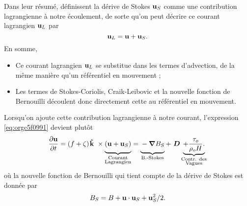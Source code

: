 \documentclass[10pt]{report}
\numberwithin{equation}{section}
\newcommand{\kvf}{\vb{\hat{k}}}
\newcommand{\uu}{\vb{u}}
\newcommand{\grande}{\vphantom{\frac{1}{xx}}}
\newcommand{\pt}{\hspace{1pt}} %
\begin{document}
Dans leur résumé, \Textcite{suzuki2016understanding}  définissent la dérive de Stokes \(\uu_S\) comme une contribution lagrangienne à notre écoulement, de sorte qu'on peut décrire ce courant lagrangien \(\uu_L\) par
\begin{equation}
   \uu_L = \uu + \uu_S.
\end{equation}
En somme, 
\begin{itemize}
\item Ce courant lagrangien \(\uu_L\) se substitue dans les termes d'advection, de la même manière qu'un référentiel en mouvement ;
\item Les termes de Stokes-Coriolis, Craik-Leibovic et la nouvelle fonction de Bernouilli découlent donc directement cette au référentiel en mouvement. \bigskip
\end{itemize}

Lorsqu'on ajoute cette contribution lagrangienne à notre courant, l'expression \ref{eq:orgc5f0991} devient plutôt
\begin{equation}
   \pdv{\uu}{t} = \qty(f+\zeta)\pt \kvf\ \times\underbrace{\grande\qty(\uu + \uu_S)}_{\substack{\text{Courant} \\ \text{Lagrangien}}} = \underbrace{\grande-\gradient{B_S}}_\text{B.-Stokes} + \ \boldsymbol{D} \underbrace{+ \frac{\tau_o}{\rho_o H}.}_{\substack{\text{Contr. des} \\ \text{Vagues}}}
\end{equation}
où la nouvelle fonction de Bernouilli qui tient compte de la dérive de Stokes est donnée par
\begin{align}
   B_S = B + \uu\cdot\uu_S + \uu_S^2/2.
\end{align}

\printbibliography
\end{document}
